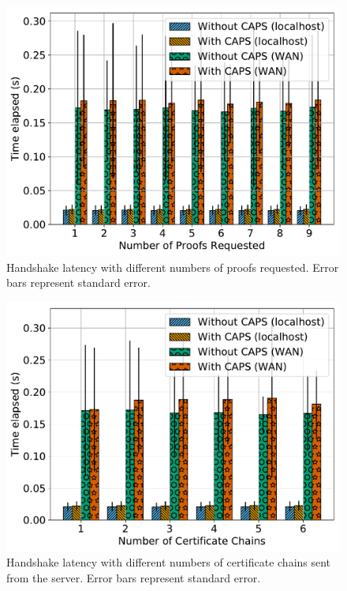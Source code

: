 \begin{figure}[t]
  \centering
  \includegraphics[width=\linewidth]{fig/eval_tls_ext/0-time_elapsed_vs_num_proofs_requested}
  \caption{Handshake latency with different numbers of proofs requested. Error
  bars represent standard error.}
  \label{fig:evaltlsext:numproof}
\end{figure}

\begin{figure}[t]
  \centering
  \includegraphics[width=\linewidth]{fig/eval_tls_ext/1-time_elapsed_vs_num_chains_sent}
  \caption{Handshake latency with different numbers of certificate chains sent
  from the server. Error bars represent standard error.}
  \label{fig:evaltlsext:numchain}
\end{figure}


